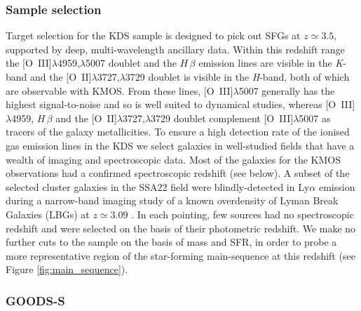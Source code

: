 \documentclass[fleqn,usenatbib]{mnras}
\begin{document}
\subsubsection{Sample selection}\label{subsubsec:sample_selection}
Target selection for the KDS sample is designed to pick out SFGs at $z\simeq3.5$, supported by deep, multi-wavelength ancillary data.
Within this redshift range the [O~{\sc III}]$\lambda$4959,$\lambda$5007 doublet and the $H\,\beta$ emission lines are visible in the {\it K}-band and the [O~{\sc II}]$\lambda$3727,$\lambda$3729 doublet is visible in the {\it H}-band, both of which are observable with KMOS.
From these lines, [O~{\sc III}]$\lambda$5007 generally has the highest signal-to-noise and so is well suited to dynamical studies, whereas [O~{\sc III}]$\lambda$4959, $H\,\beta$ and the [O~{\sc II}]$\lambda$3727,$\lambda$3729 doublet complement [O~{\sc III}]$\lambda$5007 as tracers of the galaxy metallicities. 
To ensure a high detection rate of the ionised gas emission lines in the KDS we select galaxies in well-studied fields that have a wealth of imaging and spectroscopic data.
Most of the galaxies for the KMOS observations had a confirmed spectroscopic redshift (see below).
A subset of the selected cluster galaxies in the SSA22 field were blindly-detected in Ly$\alpha$ emission during a narrow-band imaging study of a known overdensity of Lyman Break Galaxies (LBGs) at $z\simeq3.09$ \citep{Steidel2000}.
In each pointing, few sources had no spectroscopic redshift and were selected on the basis of their photometric redshift.
We make no further cuts to the sample on the basis of mass and SFR, in order to probe a more representative region of the star-forming main-sequence at this redshift (see Figure \ref{fig:main_sequence}).

\subsubsection{GOODS-S}\label{subsubsec:sample_selection_goods}
\end{document}
